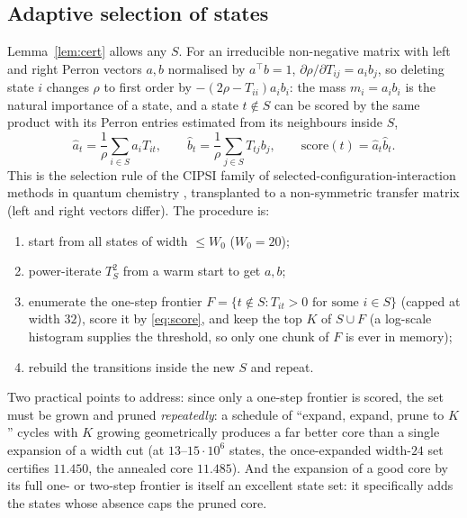 \documentclass[11pt]{amsart}
\theoremstyle{definition}
\newcommand{\ttop}{^{\!\top}}
\begin{document}
\subsection{Adaptive selection of states}\label{sec:adaptive}
Lemma~\ref{lem:cert} allows any $S$. For an irreducible non-negative matrix with left and right Perron vectors $a,b$ normalised by $a\ttop b=1$, $\partial\rho/\partial T_{ij}=a_ib_j$, so deleting state $i$ changes $\rho$ to first order by $-(2\rho-T_{ii})a_ib_i$: the mass $m_i=a_ib_i$ is the natural importance of a state, and a state $t\notin S$ can be scored by the same product with its Perron entries estimated from its neighbours inside $S$,
\begin{equation}\label{eq:score}
\hat a_t=\frac1\rho\sum_{i\in S}a_iT_{it},\qquad\hat b_t=\frac1\rho\sum_{j\in S}T_{tj}b_j,\qquad \mathrm{score}(t)=\hat a_t\hat b_t.
\end{equation}
This is the selection rule of the CIPSI family of selected-configuration-interaction methods in quantum chemistry \cite{CIPSI}, transplanted to a non-symmetric transfer matrix (left and right vectors differ). The procedure is:
\begin{enumerate}[nosep]
\item start from all states of width $\le W_0$ ($W_0=20$);
\item power-iterate $T_S^2$ from a warm start to get $a,b$;
\item enumerate the one-step frontier $F=\{t\notin S:T_{it}>0\text{ for some }i\in S\}$ (capped at width $32$), score it by \eqref{eq:score}, and keep the top $K$ of $S\cup F$ (a log-scale histogram supplies the threshold, so only one chunk of $F$ is ever in memory);
\item rebuild the transitions inside the new $S$ and repeat.
\end{enumerate}
Two practical points to address: since only a one-step frontier is scored, the set must be grown and pruned \emph{repeatedly}: a schedule of ``expand, expand, prune to $K$'' cycles with $K$ growing geometrically produces a far better core than a single expansion of a width cut (at $13$--$15\cdot10^6$ states, the once-expanded width-$24$ set certifies $11.450$, the annealed core $11.485$). And the expansion of a good core by its full one- or two-step frontier is itself an excellent state set: it specifically adds the states whose absence caps the pruned core.
\end{document}
